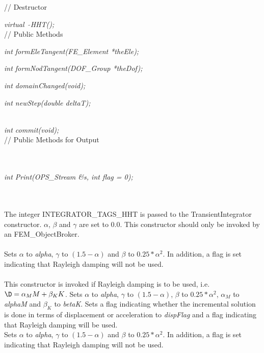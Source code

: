 // Destructor 

{\em virtual~ $\tilde{}$HHT();}\\ 

// Public Methods 

{\em int formEleTangent(FE\_Element *theEle);} 

{\em int formNodTangent(DOF\_Group *theDof);} 

{\em int domainChanged(void);}

{\em int newStep(double deltaT);}

 \\ 
{\em int commit(void);}\\ 

// Public Methods for Output

\\ 
\\ 
{\em int Print(OPS_Stream \&s, int flag = 0);}


 \\
\\ 
The integer INTEGRATOR\_TAGS\_HHT is passed to the TransientIntegrator
constructor. $\alpha$, $\beta$ and $\gamma$ are set to 0.0. This
constructor should only be invoked by an FEM\_ObjectBroker. \\

\\ 
Sets $\alpha$ to {\em alpha}, $\gamma$ to $(1.5 - \alpha)$ and $\beta$
to $0.25*\alpha^2$. In addition, a flag is set indicating that Rayleigh
damping will not be used. \\

\\ 
This constructor is invoked if Rayleigh damping is to be used, 
i.e. $\D = \alpha_M M + \beta_K K$. Sets $\alpha$ to {\em alpha},
$\gamma$ to $(1.5 - \alpha)$, $\beta$ to $0.25*\alpha^2$, $\alpha_M$ to
{\em alphaM} and $\beta_K$ to {\em betaK}. Sets a flag indicating
whether the incremental solution is done in terms of displacement or
acceleration to {\em dispFlag} and a flag indicating that Rayleigh
damping will be used. \\ 

Sets $\alpha$ to {\em alpha}, $\gamma$ to $(1.5 - \alpha)$ and $\beta$
to $0.25*\alpha^2$. In addition, a flag is set indicating that Rayleigh
damping will not be used. \\

